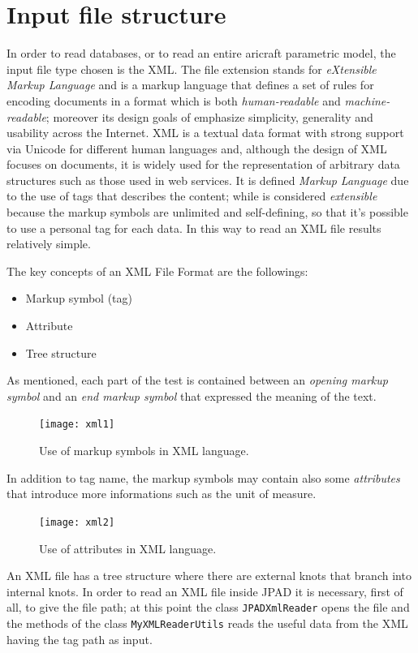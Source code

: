 \section{Input file structure}
\label{par:InputFile}
In order to read databases, or to read an entire aricraft parametric model, the input file type chosen is the XML. The file extension stands for \emph{eXtensible Markup Language} and is a markup language that defines a set of rules for encoding documents in a format which is both \emph{human-readable} and \emph{machine-readable}; moreover its design goals of emphasize simplicity, generality and usability across the Internet. XML is a textual data format with strong support via Unicode for different human languages and, although the design of XML focuses on documents, it is widely used for the representation of arbitrary data structures such as those used in web services. It is defined \emph{Markup Language} due to the use of tags that describes the content; while is considered \emph{extensible} because the markup symbols are unlimited and self-defining, so that it's possible to use a personal tag for each data. In this way to read an XML file results relatively simple.\cite{wiki:xml}

\bigskip
\noindent
The key concepts of an XML File Format are the followings:
%
\begin{itemize}
\item Markup symbol (tag)
\item Attribute
\item Tree structure
\end{itemize}
%
As mentioned, each part of the test is contained between an \emph{opening markup symbol} and an \emph{end markup symbol} that expressed the meaning of the text.
%
\begin{figure}[H]
\centering
{\texttt{[image: xml1]}
} 
\caption{Use of markup symbols in XML language.}
\end{figure}
%
\noindent
In addition to tag name, the markup symbols may contain also some \emph{attributes} that introduce more informations such as the unit of measure.
%
\begin{figure}[H]
\centering
{\texttt{[image: xml2]} 
}
\caption{Use of attributes in XML language.}
\end{figure}
%
\noindent
An XML file has a tree structure where there are external knots that branch into internal knots. In order to read an XML file inside \gls{JPAD} it is necessary, first of all, to give the file path; at this point the class \lstinline[language=Java]!JPADXmlReader! opens the file and  the methods of the class \lstinline[language=Java]!MyXMLReaderUtils! reads the useful data from the XML having the tag path as input. 


